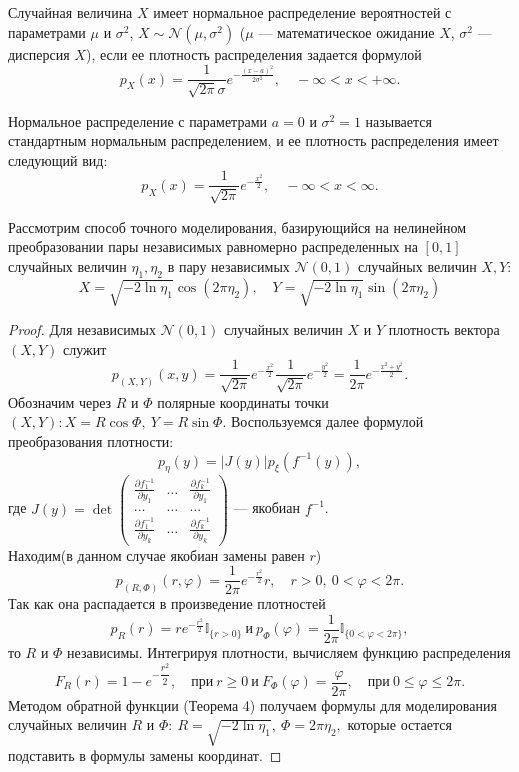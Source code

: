 \begin{definition}
	Случайная величина $ X $ имеет нормальное распределение вероятностей с параметрами
	 $ \mu $ и $ \sigma^2 $, $ X \sim \mathcal{N}(\mu,\sigma^2) $ ($ \mu $ ---
	 математическое ожидание $ X $, $ \sigma^2 $ --- дисперсия $ X $), если ее плотность
	 распределения задается формулой
	$$
	p_{X}(x) = \frac{1}{\sqrt{2\pi}\sigma} e^{-\frac{(x - a)^2} {2 \sigma^2}},
	 \quad -\infty < x < +\infty.
	$$
\end{definition}
\begin{definition}
	Нормальное распределение с параметрами $ a = 0 $ и $ \sigma^2 = 1 $ называется
	 стандартным нормальным распределением, и ее плотность распределения имеет
	 следующий вид:
	$$
	p_{X}(x) = \frac{1}{\sqrt{2\pi}} e^{-\frac{x^2}{2}}, \quad
	 -\infty < x < \infty.
	$$
\end{definition}
Рассмотрим способ точного моделирования, базирующийся на нелинейном преобразовании
 пары независимых равномерно распределенных на $ [0,1] $ случайных величин
 $ \eta_1, \eta_2 $ в пару независимых $ \mathcal{N}(0,1) $ случайных величин
 $ X, Y $:
 $$
 X = \sqrt{-2 \ln\eta_1} \cos(2 \pi \eta_2), \quad Y = \sqrt{-2 \ln \eta_1}
 \sin(2 \pi \eta_2)
 $$
\begin{proof}
	Для независимых $ \mathcal{N}(0,1) $ случайных величин $ X $ и $ Y $
	 плотность вектора $ (X,Y) $ служит
	$$
	p_{(X,Y)}(x,y) = \frac{1}{\sqrt{2 \pi}} e^{-\frac{x^2}{2}}
	 \frac{1}{\sqrt{2 \pi}} e^{-\frac{y^2}{2}} = \frac{1}{2 \pi}
	 e^{-\frac{x^2 + y^2}{2}}.
	$$
	Обозначим через $ R $ и $ \varPhi $ полярные координаты точки $ (X, Y): X =
	 R \cos \varPhi, \ Y = R \sin \varPhi $. Воспользуемся далее формулой
	 преобразования плотности:
	$$
	p_{\eta}(y) = |J(y)| p_{\xi}(f^{-1}(y)),
	$$
	где 
	$
	J(y) = \det
 	\begin{pmatrix}
  		\frac{\partial f_1^{-1}}{\partial y_1} & \dots & \frac{\partial f_k^{-1}}
		 {\partial y_1} \\
  		\dots  & \dots  & \dots \\
  		\frac{\partial f_1^{-1}}{\partial y_k} & \dots & \frac{\partial f_k^{-1}}
		 {\partial{y_k}}
	\end{pmatrix}
	$ --- якобиан $ f^{-1} $. \medskip\\ 
	Находим(в данном случае якобиан замены равен $ r $) 
	$$
	p_{(R, \varPhi)}(r, \varphi) = \frac{1}{2 \pi} e^{-\frac{r^2}{2}} r, \quad r > 0,
	 \ 0 < \varphi < 2 \pi.
	$$
	Так как она распадается в произведение плотностей 
	$$ 
	p_R(r) = r e^{-\frac{r^2}{2}} \mathbb{I}_{\{r > 0 \}} \ \text{и} \
	 p_{\varPhi}(\varphi) = \dfrac{1}{2 \pi} \mathbb{I}_{\{0 < \varphi < 2 \pi\}},
	$$ 
	то $ R $ и $ \varPhi $ независимы. Интегрируя плотности,
	 вычисляем функцию распределения 
	$$ 
	F_R(r) = 1 - e^{-\dfrac{r^2}{2}}, \quad \text{при} \ r \ge 0 \ \text{и} \
	 F_{\varPhi}(\varphi) = \dfrac{\varphi}{2 \pi}, \quad \text{при} \ 0 \le \varphi
	 \le 2 \pi.
	$$
	Методом обратной функции (Теорема 4) получаем формулы для моделирования случайных
	 величин $ R $ и $ \varPhi : \ R = \sqrt{-2 \ln \eta_1}, \ \varPhi = 2 \pi \eta_2, $
	 которые остается подставить в формулы замены координат.
\end{proof}
